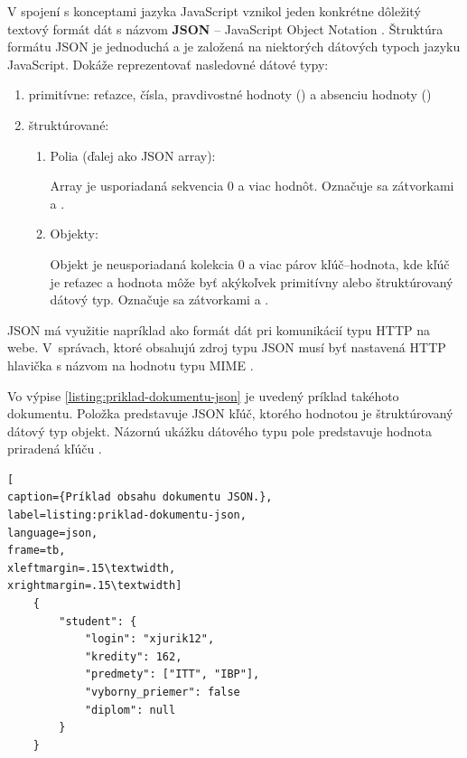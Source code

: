 V spojení s konceptami jazyka JavaScript vznikol jeden konkrétne dôležitý textový formát dát s názvom \textbf{JSON} -- JavaScript Object Notation \cite{rfc7159}.
Štruktúra formátu JSON je jednoduchá a je založená na niektorých dátových typoch jazyku JavaScript.
Dokáže reprezentovať nasledovné dátové typy:
\begin{enumerate}
    \item primitívne: reťazce, čísla, pravdivostné hodnoty () a absenciu hodnoty ()
    
    \item štruktúrované: 
    \begin{enumerate}
        \item Polia (ďalej ako JSON array):

        Array je usporiadaná sekvencia 0 a viac hodnôt. Označuje sa zátvorkami \code{[} a \code{]}. 

        \item Objekty:

        Objekt je neusporiadaná kolekcia 0 a viac párov kľúč--hodnota, kde kľúč je reťazec
        a hodnota môže byť akýkoľvek primitívny alebo štruktúrovaný dátový typ.
        Označuje sa zátvorkami \code{\{} a \code{\}}.
    \end{enumerate}
\end{enumerate}

JSON má využitie napríklad ako formát dát pri komunikácií typu HTTP na webe.
\mbox{V správach}, ktoré obsahujú zdroj typu JSON musí byť nastavená HTTP hlavička s názvom  na hodnotu typu MIME .

Vo výpise \ref{listing:priklad-dokumentu-json} je uvedený príklad takéhoto dokumentu. Položka  predstavuje JSON kľúč, ktorého hodnotou je štruktúrovaný dátový typ objekt. Názornú ukážku dátového typu pole predstavuje hodnota priradená kľúču .

\begin{center}
\centering
\begin{lstlisting}[
caption={Príklad obsahu dokumentu JSON.},
label=listing:priklad-dokumentu-json, 
language=json, 
frame=tb,
xleftmargin=.15\textwidth, 
xrightmargin=.15\textwidth]
    {       
        "student": {
            "login": "xjurik12",
            "kredity": 162,
            "predmety": ["ITT", "IBP"],
            "vyborny_priemer": false
            "diplom": null
        }
    }
\end{lstlisting}
\end{center}

